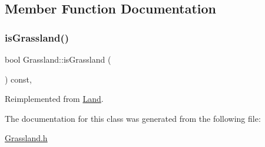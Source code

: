 \subsection{Member Function Documentation}
\mbox{\label{classGrassland_ac4f00629f20061d2ec9f792a42f7315c}} 
\subsubsection{\texorpdfstring{isGrassland()}{isGrassland()}}
{\footnotesize\ttfamily bool Grassland\+::is\+Grassland (\begin{DoxyParamCaption}{ }\end{DoxyParamCaption}) const\hspace{0.3cm}{\ttfamily [inline]}, {\ttfamily [virtual]}}



Reimplemented from \mbox{\hyperlink{classLand_aa79c16746d74c0493e66ce73f2fa0e0f}{Land}}.



The documentation for this class was generated from the following file\+:\begin{DoxyCompactItemize}
\item 
\mbox{\hyperlink{Grassland_8h}{Grassland.\+h}}\end{DoxyCompactItemize}

